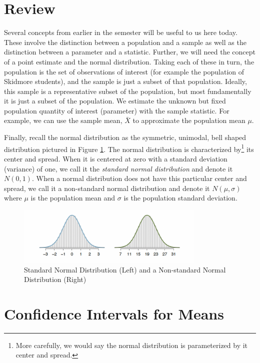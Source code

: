\documentclass[11pt]{article}
\begin{document}
\section{Review}\label{rev}

Several concepts from earlier in the semester will be useful to us here today.  These involve the distinction between a population and a sample as well as the distinction between a parameter and a statistic.  Further, we will need the concept of a point estimate and the normal distribution.  Taking each of these in turn, the population is the set of observations of interest (for example the population of Skidmore students), and the sample is just a subset of that population.  Ideally, this sample is a representative subset of the population, but most fundamentally it is just a subset of the population.  We estimate the unknown but fixed population quantity of interest (parameter) with the sample statistic.  For example, we can use the sample mean, $\bar{X}$ to approximate the population mean $\mu$.  

Finally, recall the normal distribution as the symmetric, unimodal, bell shaped distribution pictured in Figure \ref{interpfig}.  The normal distribution is characterized by\footnote{More carefully, we would say the normal distribution is parameterized by it center and spread.} its center and spread.  When it is centered at zero with a standard deviation (variance) of one, we call it the \textit{standard normal distribution} and denote it $N(0,1)$.  When a normal distribution does not have this particular center and spread, we call it a non-standard normal distribution and denote it $N(\mu, \sigma)$ where $\mu$ is the population mean and $\sigma$ is the population standard deviation.  

\begin{figure}[h]
\centering
\includegraphics[width=0.8\textwidth]{normal1.png}
\caption{Standard Normal Distribution (Left) and a Non-standard Normal Distribution (Right)}\label{interpfig}
\end{figure}


\section{Confidence Intervals for Means} 
\end{document}
